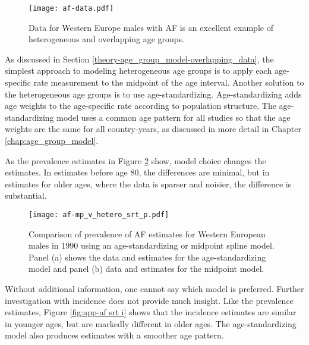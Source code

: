     \begin{figure}[h]
        \begin{center}
            \texttt{[image: af-data.pdf]}
            \caption{Data for Western Europe males with
              AF is an excellent example of heterogeneous
              and overlapping age groups.}
            \label{fig:app-af data}
        \end{center}
    \end{figure}

As discussed in Section \ref{theory-age_group_model-overlapping_data},
the simplest approach to modeling heterogeneous age groups is to apply
each age-specific rate measurement to the midpoint of the age interval.
Another solution to the heterogeneous age groups is to use age-standardizing.
Age-standardizing adds age weights to the age-specific rate according
to population structure.  The age-standardizing model uses a common
age pattern for all studies so that the age weights are the same for
all country-years, as discussed in more detail in Chapter
\ref{chap:age_group_model}.

As the prevalence estimates in Figure \ref{fig:app-af srt p} show,
model choice changes the estimates.  In estimates before age 80, the
differences are minimal, but in estimates for older ages, where the
data is sparser and noisier, the difference is substantial.

    \begin{figure}[h]
        \begin{center}
            \texttt{[image: af-mp\_v\_hetero\_srt\_p.pdf]}
            \caption{Comparison of prevalence of AF estimates for Western European
              males in 1990 using an age-standardizing
              or midpoint spline model.  Panel (a) shows the data and
              estimates for the age-standardizing model and panel (b)
              data and estimates for the midpoint model.}
            \label{fig:app-af srt p}
        \end{center}
    \end{figure}

Without additional information, one cannot say which model is preferred.
Further investigation with incidence does not provide much insight.  Like
the prevalence estimates, Figure \ref{fig:app-af srt i} shows that the
incidence estimates are similar in younger ages, but are markedly different
in older ages.  The age-standardizing model also produces estimates with a
smoother age pattern.

